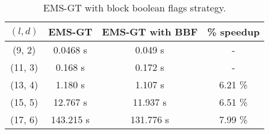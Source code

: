 \begin{table}[h] %
	\renewcommand{\arraystretch}{1.3}
	\centering
	\begin{tabular}{|c|c|c|c|}
	\hline 
	\bfseries\boldmath $(l,d)$ & 
	\bfseries\boldmath EMS-GT & 
	\bfseries\boldmath EMS-GT with BBF & 
	\bfseries \% speedup\\
	\hline
	(9, 2) & 0.0468 s &		0.049 s &	-\\
	(11, 3) & 0.168 s &		0.172 s &	-\\
	(13, 4) & 1.180 s &		1.107 s &	6.21 \%\\
	(15, 5) & 12.767 s &	11.937 s &	6.51 \%\\
	(17, 6) & 143.215 s &	131.776 s &	7.99 \%\\
	\hline\end{tabular}
	
	\caption{EMS-GT with block boolean flags strategy.}
	\label{tbl:ems-gt-bf-speedup}
\end{table}


